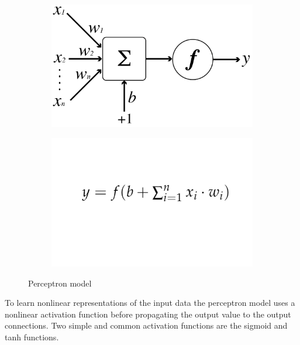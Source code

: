 \documentclass[../main.tex]{subfiles}
\begin{document}
\bigskip
\bigskip
\begin{figure}[h!]
  \centering
  \begin{subfigure}[]{0.4\textwidth}
    \includegraphics[width=\linewidth]{images/Perceptron.png}
  \end{subfigure}
  \begin{subfigure}[]{0.4\textwidth}
    \includegraphics[width=\linewidth]{images/PerceptronFormula.png}
  \end{subfigure}
  \caption{Perceptron model}
  \label{fig:Perceptron}
\end{figure}

\newpage
To learn nonlinear representations of the input data the perceptron model uses a nonlinear activation function before propagating the output value to the output connections. Two simple and common activation functions are the sigmoid and tanh functions.
\end{document}
